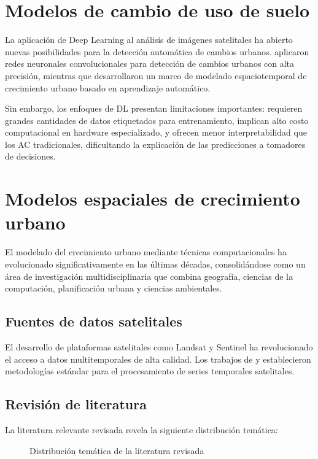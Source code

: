 \section{Modelos de cambio de uso de suelo}

La aplicación de Deep Learning al análisis de imágenes satelitales ha abierto nuevas posibilidades para la detección automática de cambios urbanos. \textcite{Ma2019} aplicaron redes neuronales convolucionales para detección de cambios urbanos con alta precisión, mientras que \textcite{Gomez2020} desarrollaron un marco de modelado espaciotemporal de crecimiento urbano basado en aprendizaje automático.

Sin embargo, los enfoques de DL presentan limitaciones importantes: requieren grandes cantidades de datos etiquetados para entrenamiento, implican alto costo computacional en hardware especializado, y ofrecen menor interpretabilidad que los AC tradicionales, dificultando la explicación de las predicciones a tomadores de decisiones.

\section{Modelos espaciales de crecimiento urbano}

El modelado del crecimiento urbano mediante técnicas computacionales ha evolucionado significativamente en las últimas décadas, consolidándose como un área de investigación multidisciplinaria que combina geografía, ciencias de la computación, planificación urbana y ciencias ambientales.

\subsection{Fuentes de datos satelitales}

El desarrollo de plataformas satelitales como Landsat y Sentinel ha revolucionado el acceso a datos multitemporales de alta calidad. Los trabajos de \textcite{Herold2003} y \textcite{Gong2013} establecieron metodologías estándar para el procesamiento de series temporales satelitales.

\subsection{Revisión de literatura}

La literatura relevante revisada revela la siguiente distribución temática:

\begin{figure}[h]
\centering
{}
\caption{Distribución temática de la literatura revisada}
\label{fig:literature_distribution}
\end{figure}

